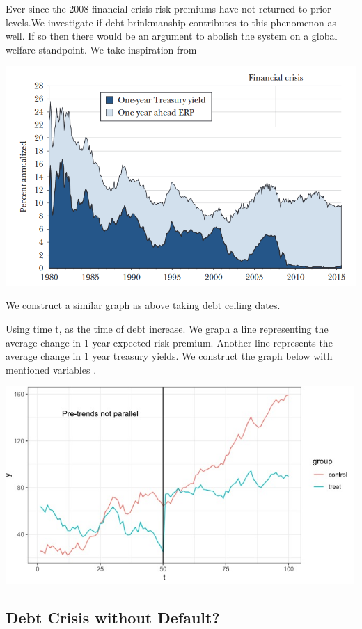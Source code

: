 \documentclass[
  12pt]{article}
\begin{document}
Ever since the 2008 financial crisis risk premiums have not returned to
prior levels\citep{caballero2017}.We investigate if debt brinkmanship
contributes to this phenomenon as well. If so then there would be an
argument to abolish the system on a global welfare standpoint. We take
inspiration from

\includegraphics[width=6.10417in,height=\textheight]{style-guide/1_year_ERP.png}

We construct a similar graph as above taking debt ceiling dates.

Using time t, as the time of debt increase. We graph a line representing
the average change in 1 year expected risk premium. Another line
represents the average change in 1 year treasury yields. We construct
the graph below with mentioned variables \citep{duarte2015}.

\includegraphics[width=5.21875in,height=\textheight]{style-guide/1_year_ERP_parallel_trends.jpeg}

\hypertarget{debt-crisis-without-default-1}{%
\subsection{Debt Crisis without
Default?}\label{debt-crisis-without-default-1}}
\end{document}
